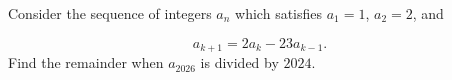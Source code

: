 Consider the sequence of integers $a_n$ which satisfies $a_1=1$, $a_2=2$, and

$$a_{k+1}=2a_k-23a_{k-1}.$$Find the remainder when $a_{2026}$ is divided by $2024$.
